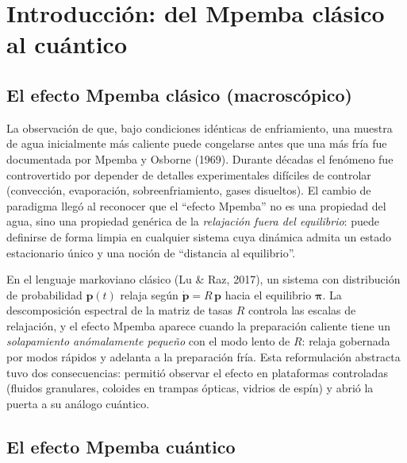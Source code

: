 \chapter{Introducción: del Mpemba clásico al cuántico}
\label{ch:intro}

\section{El efecto Mpemba clásico (macroscópico)}

La observación de que, bajo condiciones idénticas de enfriamiento, una muestra de
agua inicialmente más caliente puede congelarse antes que una más fría fue
documentada por Mpemba y Osborne (1969). Durante décadas el fenómeno fue
controvertido por depender de detalles experimentales difíciles de controlar
(convección, evaporación, sobreenfriamiento, gases disueltos). El cambio de
paradigma llegó al reconocer que el ``efecto Mpemba'' no es una propiedad del
agua, sino una propiedad genérica de la \emph{relajación fuera del equilibrio}:
puede definirse de forma limpia en cualquier sistema cuya dinámica admita un
estado estacionario único y una noción de ``distancia al equilibrio''.

En el lenguaje markoviano clásico (Lu \& Raz, 2017), un sistema con
distribución de probabilidad $\bm{p}(t)$ relaja según $\dot{\bm{p}} = R\,\bm{p}$
hacia el equilibrio $\bm{\pi}$. La descomposición espectral de la matriz de tasas
$R$ controla las escalas de relajación, y el efecto Mpemba aparece cuando la
preparación caliente tiene un \emph{solapamiento anómalamente pequeño} con el
modo lento de $R$: relaja gobernada por modos rápidos y adelanta a la
preparación fría. Esta reformulación abstracta tuvo dos consecuencias: permitió
observar el efecto en plataformas controladas (fluidos granulares, coloides en
trampas ópticas, vidrios de espín) y abrió la puerta a su análogo cuántico.

\section{El efecto Mpemba cuántico}


